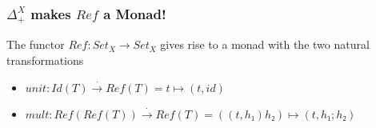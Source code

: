 \documentclass[aspectratio=169]{beamer}
\theoremstyle{remarkstyle}
\begin{document}
\begin{frame}[fragile]
  \frametitle{$Δ_+^X$ makes $Ref$ a Monad!}
  \begin{theorem}
    The functor $Ref : Set_X → Set_X$ gives rise to a monad with the two natural transformations
    \begin{itemize}
      \item $unit : Id(T) \stackrel{⋅}{→} Ref(T) = t ↦ (t, id)$ 
      \item $mult : Ref(Ref(T)) \stackrel{⋅}{→} Ref(T) = ((t, h₁) h₂) ↦ (t, h₁;h₂)$
    \end{itemize}
  \end{theorem}
  \begin{example}
  \end{example}
\end{frame}
\end{document}
